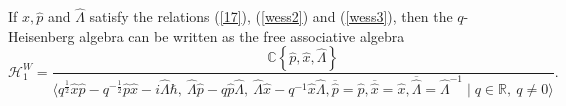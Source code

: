 \documentclass[12pt,a4paper]{article}
\theoremstyle{plain}
\newtheorem{proposition}[theorem]{Proposition}
\theoremstyle{definition}
\theoremstyle{remark}
\begin{document}

If $\hat{x}, \hat{p}$ and $\hat{\Lambda}$ satisfy the relations (\ref{17}), (\ref{wess2}) and (\ref{wess3}), then the $q$-Heisenberg algebra can be written as the free associative algebra
    \begin{equation*}
        \mathcal{H}_{1}^{W} = \frac{\mathbb{C}\left\{ \hat{p}, \hat{x}, \hat{\Lambda} \right\} }{ \langle q^{\frac{1}{2}} \hat{x}\hat{p} - q^{-\frac{1}{2}} \hat{p}\hat{x} - i\hat{\Lambda}\hbar, \ \hat{\Lambda} \hat{p} - q \hat{p} \hat{\Lambda}, \ \hat{\Lambda} \hat{x} - q^{-1} \hat{x} \hat{\Lambda}, \overline{\hat{p}}=\hat{p},\overline{\hat{x}} = \hat{x}, \overline{\hat{\Lambda}}=\hat{\Lambda}^{-1}\mid q\in \mathbb{R}, \ q\neq 0 \rangle}.
    \end{equation*}
\end{document}
